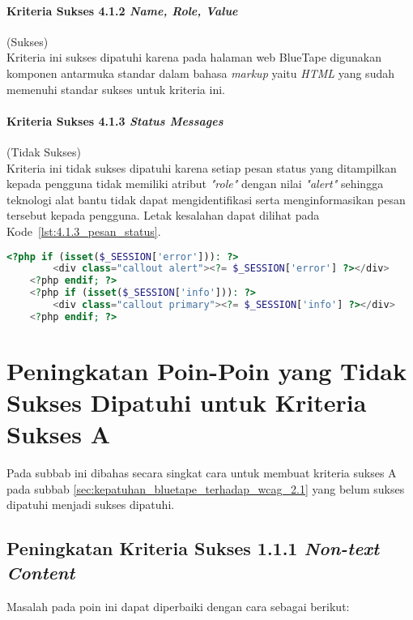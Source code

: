 \paragraph{Kriteria Sukses 4.1.2 \textit{Name, Role, Value}}
\label{par:kepatuhan_bluetape_kriteria_sukses_4.1.2}
(Sukses)\\

Kriteria ini sukses dipatuhi karena pada halaman web BlueTape digunakan komponen antarmuka standar dalam bahasa \textit{markup} yaitu \textit{HTML} yang sudah memenuhi standar sukses untuk kriteria ini.

\paragraph{Kriteria Sukses 4.1.3 \textit{Status Messages}}
\label{par:kepatuhan_bluetape_kriteria_sukses_4.1.3}
(Tidak Sukses)\\

Kriteria ini tidak sukses dipatuhi karena setiap pesan status yang ditampilkan kepada pengguna tidak memiliki atribut \textit{"role"} dengan nilai \textit{"alert"} sehingga teknologi alat bantu tidak dapat mengidentifikasi serta menginformasikan pesan tersebut kepada pengguna. Letak kesalahan dapat dilihat pada \mbox{Kode \ref{lst:4.1.3_pesan_status}}.

\begin{lstlisting}[frame=single, label={lst:4.1.3_pesan_status}, language=PHP, caption=Pelanggaran Kriteria Sukses 4.1.3 pada Bagian Pesan Status]
    <?php if (isset($_SESSION['error'])): ?>
        <div class="callout alert"><?= $_SESSION['error'] ?></div>
    <?php endif; ?>
    <?php if (isset($_SESSION['info'])): ?>
        <div class="callout primary"><?= $_SESSION['info'] ?></div>
    <?php endif; ?>
\end{lstlisting}

\section{Peningkatan Poin-Poin yang Tidak Sukses Dipatuhi untuk Kriteria Sukses A}
\label{sec:peningkatan_kriteria_sukses_a}
Pada subbab ini dibahas secara singkat cara untuk membuat kriteria sukses A pada subbab \ref{sec:kepatuhan_bluetape_terhadap_wcag_2.1} yang belum sukses dipatuhi menjadi sukses dipatuhi.

\subsection{Peningkatan Kriteria Sukses 1.1.1 \textit{Non-text Content}}
\label{subsec:peningkatan_kriteria_sukses_1.1.1}
Masalah pada poin ini dapat diperbaiki dengan cara sebagai berikut: 

